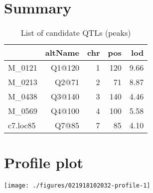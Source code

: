 \documentclass[a4paper,11pt]{article}\usepackage[]{graphicx}\usepackage[]{color}
\makeatletter
\def\maxwidth{ %
  \ifdim\Gin@nat@width>\linewidth
    \linewidth
  \else
    \Gin@nat@width
  \fi
}
\newenvironment{knitrout}{}{} %
\makeatother
\begin{document}
\section{Summary}
\begin{table}[ht]
\begin{flushleft}
\caption{List of candidate QTLs (peaks)} 
\label{summary}
\begin{tabular}{lrrrr}
  \hline
 & altName & chr & pos & lod \\ 
  \hline
M\_0121 & Q1@120 & 1 & 120 & 9.66 \\ 
  M\_0213 & Q2@71 & 2 & 71 & 8.87 \\ 
  M\_0438 & Q3@140 & 3 & 140 & 4.46 \\ 
  M\_0569 & Q4@100 & 4 & 100 & 5.58 \\ 
  c7.loc85 & Q7@85 & 7 & 85 & 4.10 \\ 
   \hline
\end{tabular}
\end{flushleft}
\end{table}

\newpage
\section{Profile plot}
\begin{knitrout}
\color{fgcolor}

\texttt{[image: ./figures/021918102032-profile-1]} \hfill{}



\end{knitrout}
\end{document}
